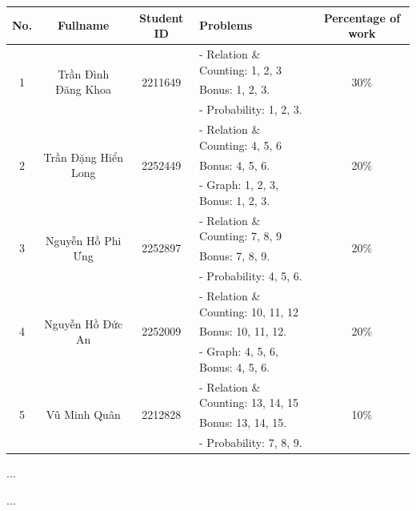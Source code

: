 \documentclass[a4paper]{article}
\begin{document}
\begin{center}
\begin{tabular}{|c|c|c|l|c|}
\hline
\textbf{No.} & \textbf{Fullname} & \textbf{Student ID} & \textbf{Problems} & \textbf{Percentage of work}\\
\hline 
\multirow{3}{*}{1} & \multirow{3}{*}{Trần Đình Đăng Khoa} & \multirow{3}{*}{2211649} & - Relation \& Counting: 1, 2, 3& \multirow{3}{*}{30\%}\\
 & &  & Bonus: 1, 2, 3. &\\
 & &  & - Probability: 1, 2, 3. &\\
\hline 
\multirow{3}{*}{2} & \multirow{3}{*}{Trần Đặng Hiển Long} & \multirow{3}{*}{2252449} & - Relation \& Counting: 4, 5, 6& \multirow{3}{*}{20\%}\\
 & &  & Bonus: 4, 5, 6. &\\
 & &  & - Graph: 1, 2, 3, Bonus: 1, 2, 3. &\\
\hline
\multirow{3}{*}{3} & \multirow{3}{*}{Nguyễn Hồ Phi Ưng} & \multirow{3}{*}{2252897} & - Relation \& Counting: 7, 8, 9& \multirow{3}{*}{20\%}\\
 & &  & Bonus: 7, 8, 9. &\\
 & &  & - Probability: 4, 5, 6. &\\
\hline
\multirow{3}{*}{4} & \multirow{3}{*}{Nguyễn Hồ Đức An} & \multirow{3}{*}{2252009} & - Relation \& Counting: 10, 11, 12& \multirow{3}{*}{20\%}\\
 & &  & Bonus: 10, 11, 12. &\\
 & &  & - Graph: 4, 5, 6, Bonus: 4, 5, 6. &\\
\hline
\multirow{3}{*}{5} & \multirow{3}{*}{Vũ Minh Quân} & \multirow{3}{*}{2212828} & - Relation \& Counting: 13, 14, 15& \multirow{3}{*}{10\%}\\
 & &  & Bonus: 13, 14, 15. &\\
 & &  & - Probability: 7, 8, 9. &\\
\hline
\end{tabular}
\end{center}

\begin{thebibliography}{80}


...


...


\end{thebibliography}
\end{document}
